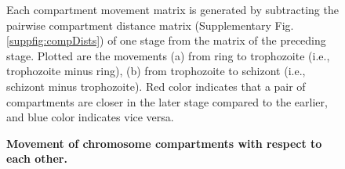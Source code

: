 \documentclass{article}
\begin{document}
\begin{figure}
  \begin{center}
  \hspace{0.03\textwidth}
  \end{center}
\caption{{\bf Movement of chromosome compartments with respect to each other.}}
{ Each compartment movement matrix is generated by subtracting the pairwise compartment
    distance matrix (Supplementary Fig. \ref{suppfig:compDists}) of one stage from the
    matrix of the preceding stage. Plotted are the movements (a) from ring to trophozoite
    (i.e., trophozoite minus ring), (b) from trophozoite to schizont (i.e.,  schizont minus
    trophozoite). Red color indicates that a pair of compartments are closer in the later
    stage compared to the earlier, and blue color indicates vice versa.
}
\label{suppfig:compMovement}
\end{figure}
\clearpage
\end{document}
